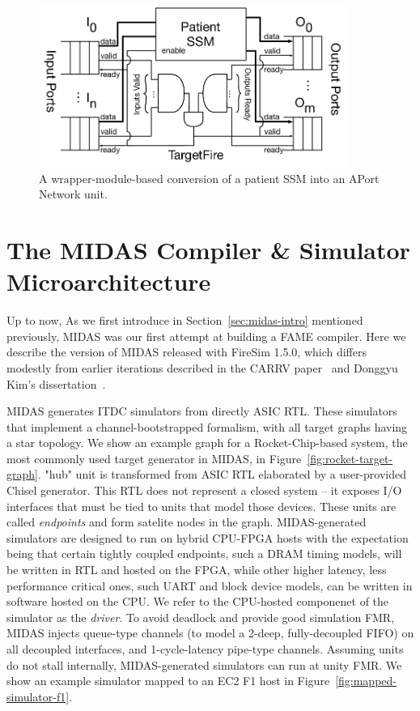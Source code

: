 \begin{figure}
    \centering
    \includegraphics[width=0.9\textwidth]{figures/aport-network-wrapper.pdf}
    \caption{A wrapper-module-based conversion of a patient SSM into an APort Network unit.}
    \label{fig:aport-network-wrapper}
\end{figure}

\section{The MIDAS Compiler \& Simulator Microarchitecture}
Up to now, As we first introduce in Section~\ref{sec:midas-intro} mentioned previously,
MIDAS was our first attempt at building a FAME compiler. Here we describe the
version of MIDAS released with FireSim 1.5.0, which differs modestly from earlier iterations 
described in the CARRV paper~\cite{MIDAS} and Donggyu Kim's dissertation~\cite{DGKDissertation}.

MIDAS generates ITDC simulators from directly ASIC RTL. These simulators that
implement a channel-bootstrapped formalism, with all target graphs having a
star topology. We show an example graph for a Rocket-Chip-based system, the
most commonly used target generator in MIDAS, in Figure~\ref{fig:rocket-target-graph}.
"hub" unit is transformed from ASIC RTL elaborated by a user-provided Chisel
generator. This RTL does not represent a
closed system -- it exposes I/O interfaces that must be tied to units that model those
devices. These units are called \emph{endpoints} and form satelite nodes in the graph.
MIDAS-generated simulators are designed to run on hybrid CPU-FPGA hosts
with the expectation being that certain tightly coupled endpoints, such a DRAM
timing models, will be written in RTL and hosted on the FPGA, while other higher
latency, less performance critical ones, such UART and block device models, can
be written in software hosted on the CPU. We refer to the CPU-hosted componenet
of the simulator as the \emph{driver}. To avoid deadlock and provide good
simulation FMR, MIDAS injects queue-type channels (to model a 2-deep,
fully-decoupled FIFO) on all decoupled interfaces, and 1-cycle-latency
pipe-type channels. Assuming units do not stall internally, MIDAS-generated
simulators can run at unity FMR. We show an example simulator mapped to an EC2 F1 host in Figure~\ref{fig:mapped-simulator-f1}.

